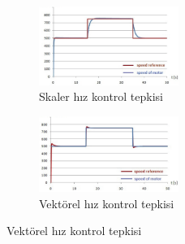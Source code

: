 \documentclass[10pt,a4paper]{article}
\begin{document}
	\begin{figure}[hp]
		\centering
		\begin{subfigure}[hp]{1.0\textwidth}
			\centering
			\shorthandoff{=}
			\includegraphics[width=0.5\textwidth]{speed_scaler.png}
			\caption{Skaler hız kontrol tepkisi}
			\label{subfig:speed_scaler}
			\shorthandon{=}
		\end{subfigure}
		\begin{subfigure}[hp]{1.0\textwidth}
			\centering
			\shorthandoff{=}
			\includegraphics[width=0.5\textwidth]{speed_vector.png}
			\caption{Vektörel hız kontrol tepkisi}
			\label{subfig:speed_vector}
			\shorthandon{=}
		\end{subfigure}
		
	\end{figure}
	
\end{document}
